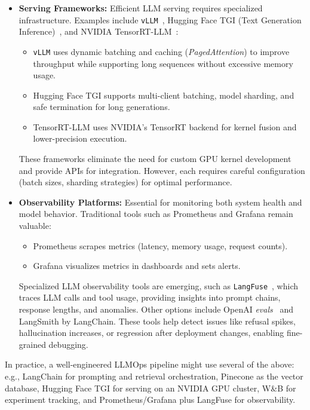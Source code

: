 \begin{itemize}
    \item \textbf{Serving Frameworks:} Efficient LLM serving requires specialized infrastructure.  
    Examples include \texttt{vLLM}~\cite{Kwon2023vLLM}, Hugging Face TGI (Text Generation Inference)~\cite{tgi-whitepaper}, and NVIDIA TensorRT-LLM~\cite{tensorrt-llm}:
    \begin{itemize}
        \item \texttt{vLLM} uses dynamic batching and caching (\emph{PagedAttention}) to improve throughput while supporting long sequences without excessive memory usage.
        \item Hugging Face TGI supports multi-client batching, model sharding, and safe termination for long generations.
        \item TensorRT-LLM uses NVIDIA’s TensorRT backend for kernel fusion and lower-precision execution.
    \end{itemize}
    These frameworks eliminate the need for custom GPU kernel development and provide APIs for integration. However, each requires careful configuration (batch sizes, sharding strategies) for optimal performance.

    \item \textbf{Observability Platforms:} Essential for monitoring both system health and model behavior.  
    Traditional tools such as Prometheus and Grafana remain valuable:
    \begin{itemize}
        \item Prometheus scrapes metrics (latency, memory usage, request counts).
        \item Grafana visualizes metrics in dashboards and sets alerts.
    \end{itemize}
    Specialized LLM observability tools are emerging, such as \texttt{LangFuse}~\cite{langfuse_docs}, which traces LLM calls and tool usage, providing insights into prompt chains, response lengths, and anomalies. Other options include OpenAI \emph{evals}~\cite{openai_evals} and LangSmith by LangChain.  
    These tools help detect issues like refusal spikes, hallucination increases, or regression after deployment changes, enabling fine-grained debugging.
\end{itemize}

In practice, a well-engineered LLMOps pipeline might use several of the above: e.g., LangChain for prompting and retrieval orchestration, Pinecone as the vector database, Hugging Face TGI for serving on an NVIDIA GPU cluster, W\&B for experiment tracking, and Prometheus/Grafana plus LangFuse for observability.  

